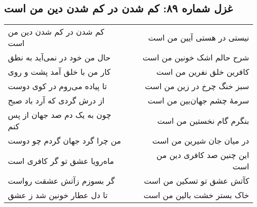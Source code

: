 \begin{center}
\section*{غزل شماره ۸۹: کم شدن در کم شدن دین من است}
\label{sec:089}
\begin{longtable}{l p{0.5cm} r}
کم شدن در کم شدن دین من است
&&
نیستی در هستی آیین من است
\\
حال من خود در نمی‌آید به نطق
&&
شرح حالم اشک خونین من است
\\
کار من با خلق آمد پشت و روی
&&
کافرین خلق نفرین من است
\\
تا پیاده می‌روم در کوی دوست
&&
سبز خنگ چرخ در زین من است
\\
از درش گردی که آرد باد صبح
&&
سرمهٔ چشم جهان‌بین من است
\\
چون به یک دم صد جهان از پس کنم
&&
بنگرم گام نخستین من است
\\
من چرا گرد جهان گردم چو دوست
&&
در میان جان شیرین من است
\\
ماه‌رویا عشق تو گر کافری است
&&
این چنین صد کافری دین من است
\\
گر بسوزم زآتش عشقت رواست
&&
کآتش عشق تو تسکین من است
\\
تا دل عطار خونین شد ز عشق
&&
خاک بستر خشت بالین من است
\\
\end{longtable}
\end{center}
